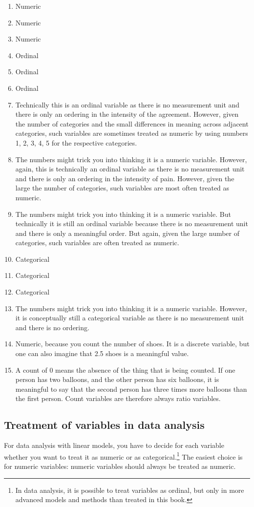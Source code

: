 \documentclass[]{report}\usepackage[]{graphicx}\usepackage[]{color}
\begin{document}
\begin{enumerate}
\item Numeric
\item Numeric
\item Numeric
\item Ordinal
\item Ordinal
\item Ordinal
\item Technically this is an ordinal variable as there is no measurement unit and there is only an ordering in the intensity of the agreement. However, given the number of categories and the small differences in meaning across adjacent categories, such variables are sometimes treated as numeric by using numbers 1, 2, 3, 4, 5 for the respective categories.
\item The numbers might trick you into thinking it is a numeric variable. However, again, this is technically an ordinal variable as there is no measurement unit and there is only an ordering in the intensity of pain. However, given the large the number of categories, such variables are most often treated as numeric.
\item The numbers might trick you into thinking it is a numeric variable. But technically it is still an ordinal variable because there is no measurement unit and there is only a meaningful order. But again, given the large number of categories, such variables are often treated as numeric.
\item Categorical
\item Categorical
\item Categorical
\item The numbers might trick you into thinking it is a numeric variable. However, it is conceptually still a categorical variable as there is no measurement unit and there is no ordering.
\item Numeric, because you count the number of shoes. It is a discrete variable, but one can also imagine that 2.5 shoes is a meaningful value.
\item A count of 0 means the absence of the thing that is being counted. If one person has two balloons, and the other person has six balloons, it is meaningful to say that the second person has three times more balloons than the first person. Count variables are therefore always ratio variables.
\end{enumerate}



\subsection{Treatment of variables in data analysis}
For data analysis with linear models, you have to decide for each variable whether you want to treat it as numeric or as categorical.\footnote{In data analysis, it is possible to treat variables as ordinal, but only in more advanced models and methods than treated in this book.} The easiest choice is for numeric variables: numeric variables should always be treated as numeric.
\end{document}
